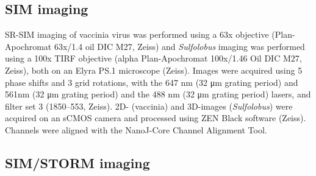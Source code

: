 \subsection{SIM imaging}

SR-SIM imaging of vaccinia virus was performed using a 63x objective (Plan-Apochromat 63x/1.4 oil DIC M27, Zeiss) and \emph{Sulfolobus} imaging was performed using a 100x TIRF objective (alpha Plan-Apochromat 100x/1.46 Oil DIC M27, Zeiss), both on an Elyra PS.1 microscope (Zeiss). Images were acquired using 5 phase shifts and 3 grid rotations, with the 647 nm (32 μm grating period) and 561nm (32 μm grating period) and the 488 nm (32 μm grating period) lasers, and filter set 3 (1850–553, Zeiss). 2D- (vaccinia) and 3D-images (\textit{Sulfolobus}) were acquired on an sCMOS camera and processed using ZEN Black software (Zeiss). Channels were aligned with the NanoJ-Core Channel Alignment Tool.

\subsection{SIM/STORM imaging}


